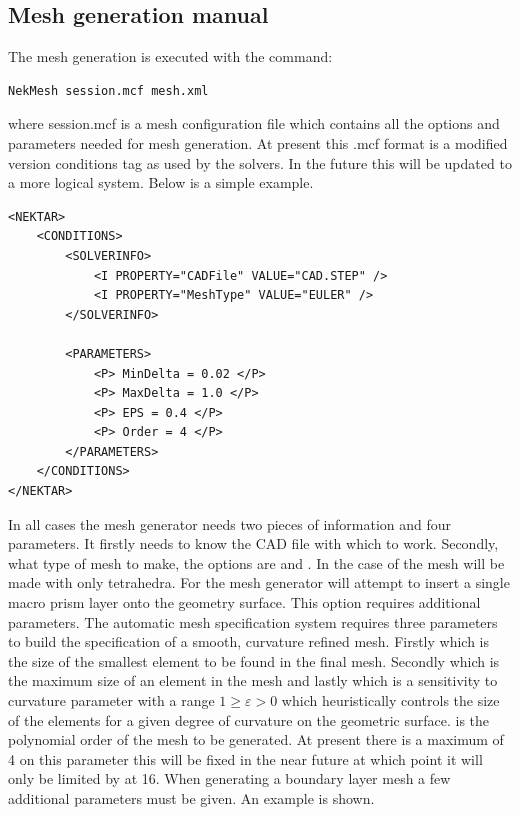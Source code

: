 \subsection{Mesh generation manual}

The mesh generation is executed with the command:
\begin{lstlisting}[style=BashInputStyle]
    NekMesh session.mcf mesh.xml
\end{lstlisting}
where session.mcf is a mesh configuration file which contains all the options
and parameters needed for mesh generation. At present this .mcf format is a
modified version conditions tag as used by the solvers. In the future this will
be updated to a more logical system. Below is a simple
example.
\begin{lstlisting}[style=XmlStyle]
<NEKTAR>
    <CONDITIONS>
        <SOLVERINFO>
            <I PROPERTY="CADFile" VALUE="CAD.STEP" />
            <I PROPERTY="MeshType" VALUE="EULER" />
        </SOLVERINFO>

        <PARAMETERS>
            <P> MinDelta = 0.02 </P>
            <P> MaxDelta = 1.0 </P>
            <P> EPS = 0.4 </P>
            <P> Order = 4 </P>
        </PARAMETERS>
    </CONDITIONS>
</NEKTAR>
\end{lstlisting}
In all cases the mesh generator needs two pieces of information and four
parameters. It firstly needs to know the CAD file with which to work. Secondly,
what type of mesh to make, the options are  and . In the
case of  the mesh will be made with only tetrahedra. For 
the mesh generator will attempt to insert a single macro prism layer onto the
geometry surface. This option requires additional parameters. The automatic
mesh specification system requires three parameters to build the specification
of a smooth, curvature refined mesh. Firstly  which is the size
of the smallest element to be found in the final mesh. Secondly 
which is the maximum size of an element in the mesh and lastly  which
is a sensitivity to curvature parameter with a range $1 \geq \varepsilon > 0$
which heuristically controls the size of the elements for a given degree of
curvature on the geometric surface.  is the polynomial order of
the mesh to be generated. At present there is a maximum of 4 on this parameter
this will be fixed in the near future at which point it will only be limited
by \nekpp at 16.
%
When generating a boundary layer mesh a few additional parameters must be given.
An example is shown.

